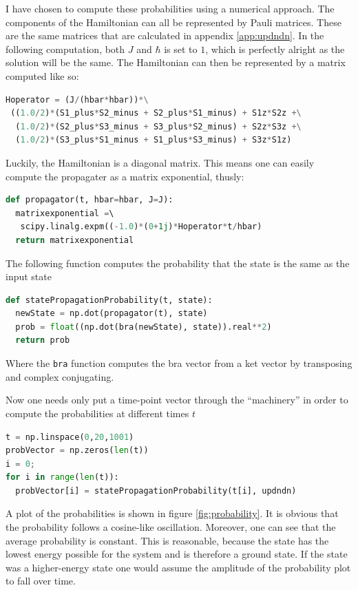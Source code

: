 \documentclass{article}
\begin{document}
I have chosen to compute these probabilities using a numerical approach. The components of the Hamiltonian can all be represented by Pauli matrices. These are the same matrices that are calculated in appendix \ref{app:updndn}. In the following computation, both $J$ and $\hbar$ is set to $1$, which is perfectly alright as the solution will be the same. The Hamiltonian can then be represented by a matrix computed like so:
\begin{lstlisting}[language=Python]
Hoperator = (J/(hbar*hbar))*\
 ((1.0/2)*(S1_plus*S2_minus + S2_plus*S1_minus) + S1z*S2z +\
  (1.0/2)*(S2_plus*S3_minus + S3_plus*S2_minus) + S2z*S3z +\
  (1.0/2)*(S3_plus*S1_minus + S1_plus*S3_minus) + S3z*S1z)
\end{lstlisting}
Luckily, the Hamiltonian is a diagonal matrix. This means one can easily compute the propagater as a matrix exponential, thusly:
\begin{lstlisting}[language=Python]
def propagator(t, hbar=hbar, J=J):
  matrixexponential =\ 
   scipy.linalg.expm((-1.0)*(0+1j)*Hoperator*t/hbar)
  return matrixexponential
\end{lstlisting}
The following function computes the probability that the state is the same as the input state
\begin{lstlisting}[language=Python]
def statePropagationProbability(t, state):
  newState = np.dot(propagator(t), state)
  prob = float((np.dot(bra(newState), state)).real**2)
  return prob
\end{lstlisting}
Where the \verb|bra| function computes the bra vector from a ket vector by transposing and complex conjugating.

Now one needs only put a time-point vector through the ``machinery'' in order to compute the probabilities at different times $t$
\begin{lstlisting}[language=Python]
t = np.linspace(0,20,1001)
probVector = np.zeros(len(t))
i = 0;
for i in range(len(t)):
  probVector[i] = statePropagationProbability(t[i], updndn)
\end{lstlisting}
A plot of the probabilities is shown in figure \ref{fig:probability}. It is obvious that the probability follows a cosine-like oscillation. Moreover, one can see that the average probability is constant. This is reasonable, because the state has the lowest energy possible for the system and is therefore a ground state. If the state was a higher-energy state one would assume the amplitude of the probability plot to fall over time.
\end{document}

